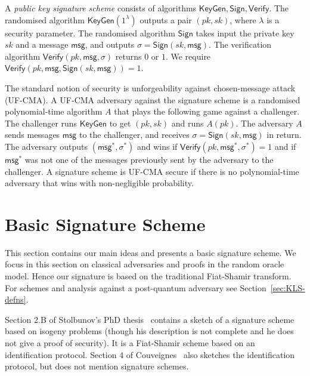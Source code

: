 \documentclass{llncs}
\newcommand{\msg}{\mathsf{msg}}
\newcommand{\KeyGen}{\mathsf{KeyGen}}
\newcommand{\Sign}{\mathsf{Sign}}
\newcommand{\Verify}{\mathsf{Verify}}
\begin{document}
A \emph{public key signature scheme} consists of algorithms $\KeyGen, \Sign, \Verify$.
The randomised algorithm $\KeyGen( 1^\lambda )$ outputs a pair $(pk,sk)$, where $\lambda$ is a security parameter.
The randomised algorithm $\Sign$ takes input the private key $sk$ and a message $\msg$, and  outputs $\sigma = \Sign( sk, \msg )$.
The verification algorithm $\Verify( pk, \msg, \sigma )$ returns $0$ or $1$.
We require $\Verify( pk, \msg, \Sign( sk, \msg )) = 1$.


The standard notion of security is unforgeability against chosen-message attack (UF-CMA).
A UF-CMA adversary against the signature scheme is a randomised polynomial-time algorithm $A$ that plays the following game against a challenger.
The challenger runs $\KeyGen$ to get $(pk,sk)$ and runs $A( pk )$.
The adversary $A$ sends messages $\msg$ to the challenger, and receives $\sigma = \Sign(sk, \msg)$ in return.
The adversary outputs $(\msg^*, \sigma^*)$ and wins if $\Verify( pk, \msg^*, \sigma^* ) = 1$ and if $\msg^*$ was not one of the messages previously sent by the adversary to the challenger.
A signature scheme is UF-CMA secure if there is no polynomial-time adversary that wins with non-negligible probability.






\section{Basic Signature Scheme}\label{sec:basic-scheme}

This section contains our main ideas and presents a basic signature scheme.
We focus in this section on classical adversaries and proofs in the random oracle model.
Hence our signature is based on the traditional Fiat-Shamir transform.
For schemes and analysis against a post-quantum adversary see Section~\ref{sec:KLS-defns}.


Section 2.B of Stolbunov's PhD thesis~\cite{Sto12} contains a sketch of a signature scheme based on isogeny problems (though his description is not complete and he does not give a proof of security).
It is a Fiat-Shamir scheme based on an identification protocol.
Section 4 of Couveignes~\cite{Couv06} also sketches the identification protocol, but does not mention signature schemes.
\end{document}
